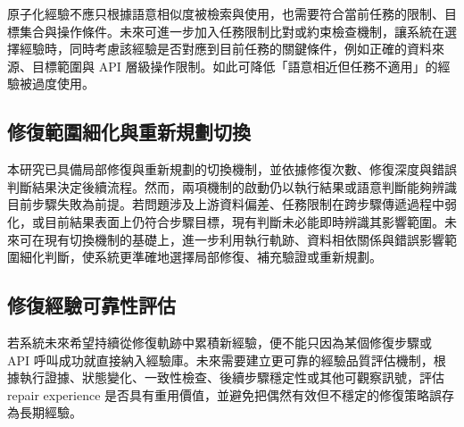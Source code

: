 \begin{ZhChapter}
原子化經驗不應只根據語意相似度被檢索與使用，也需要符合當前任務的限制、目標集合與操作條件。未來可進一步加入任務限制比對或約束檢查機制，讓系統在選擇經驗時，同時考慮該經驗是否對應到目前任務的關鍵條件，例如正確的資料來源、目標範圍與 API 層級操作限制。如此可降低「語意相近但任務不適用」的經驗被過度使用。

\subsection*{修復範圍細化與重新規劃切換}

本研究已具備局部修復與重新規劃的切換機制，並依據修復次數、修復深度與錯誤判斷結果決定後續流程。然而，兩項機制的啟動仍以執行結果或語意判斷能夠辨識目前步驟失敗為前提。若問題涉及上游資料偏差、任務限制在跨步驟傳遞過程中弱化，或目前結果表面上仍符合步驟目標，現有判斷未必能即時辨識其影響範圍。未來可在現有切換機制的基礎上，進一步利用執行軌跡、資料相依關係與錯誤影響範圍細化判斷，使系統更準確地選擇局部修復、補充驗證或重新規劃。

\subsection*{修復經驗可靠性評估}

若系統未來希望持續從修復軌跡中累積新經驗，便不能只因為某個修復步驟或 API 呼叫成功就直接納入經驗庫。未來需要建立更可靠的經驗品質評估機制，根據執行證據、狀態變化、一致性檢查、後續步驟穩定性或其他可觀察訊號，評估 repair experience 是否具有重用價值，並避免把偶然有效但不穩定的修復策略誤存為長期經驗。

\end{ZhChapter}
